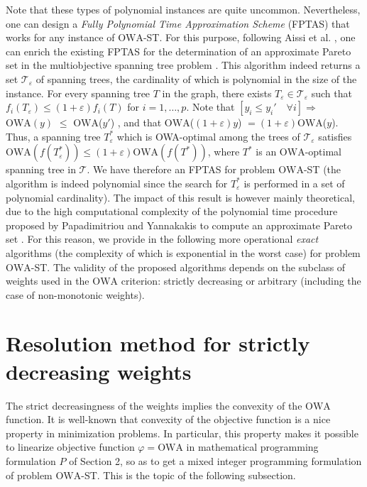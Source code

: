 \documentclass[final,3p,times]{elsarticle}
\newcommand{\owa}{\mbox{OWA}}
\begin{document}
Note that these types of polynomial instances are quite
uncommon. Nevertheless, one can design a \emph{Fully Polynomial Time
  Approximation Scheme} (FPTAS) that works for any instance of
$\owa$-ST. For this purpose, following Aissi et al. \cite{AisBV07},
one can enrich the existing FPTAS for the determination of an
approximate Pareto set in the multiobjective spanning tree problem
\cite{PapaY00}. This algorithm indeed returns a set ${\mathcal
  T_{\varepsilon}}$ of spanning trees, the cardinality of which is
polynomial in the size of the instance. For every spanning tree $T$ in
the graph, there exists $T_{\varepsilon} \in {\mathcal
  T_{\varepsilon}}$ such that $f_i(T_{\varepsilon}) \leq
(1+\varepsilon) f_i(T)$ for $i=1, \ldots, p$. Note that $[y_i \leq
y_i' \quad \forall i] \Rightarrow$ $\owa(y)$ $\leq$ $\owa$($y'$)
\cite{fodMR95}, and that $\owa$($(1+\varepsilon)y$) $= (1+\varepsilon)
\owa$($y$). Thus, a spanning tree $T^*_{\varepsilon}$ which is
OWA-optimal among the trees of ${\mathcal T_{\varepsilon}}$ satisfies
$\owa(f(T^*_{\varepsilon})) \leq (1+\varepsilon) \owa(f(T^*))$, where
$T^*$ is an $\owa$-optimal spanning tree in ${\mathcal T}$. We have
therefore an FPTAS for problem $\owa$-ST (the algorithm is indeed
polynomial since the search for $T^*_{\varepsilon}$ is performed in a
set of polynomial cardinality). The impact of this result is however
mainly theoretical, due to the high computational complexity of the
polynomial time procedure proposed by Papadimitriou and Yannakakis to compute an approximate Pareto set \cite{PapaY00}. For this reason,
we provide in the following more operational \emph{exact} algorithms (the
complexity of which is exponential in the worst case) for problem
$\owa$-ST.  The validity of the proposed algorithms depends on the
subclass of weights used in the $\owa$ criterion: strictly decreasing
or arbitrary (including the case of non-monotonic weights).





\section{Resolution method for strictly decreasing weights}

The strict decreasingness of the weights implies the convexity of the $\owa$ function. It is well-known that convexity of the objective function is a nice property in minimization problems. In particular, this property makes it possible to linearize objective function $\varphi = \owa$ in mathematical programming formulation $P$ of Section 2, so as to get a mixed integer programming formulation of problem $\owa$-ST. This is the topic of the following subsection.
\end{document}
